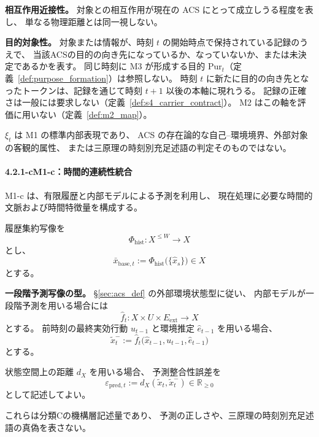 \noindent\textbf{相互作用近接性。}
対象との相互作用が現在の ACS にとって成立しうる程度を表し、
単なる物理距離とは同一視しない。

\noindent\textbf{目的対象性。}
対象または情報が、時刻 $t$ の開始時点で保持されている記録のうえで、
当該ACSの目的の向き先になっているか、なっていないか、または未決定であるかを表す。
同じ時刻に M3 が形成する目的 $\mathrm{Pur}_t$（定義~\ref{def:purpose_formation}）は参照しない。
時刻 $t$ に新たに目的の向き先となったトークンは、記録を通じて時刻 $t+1$ 以後の本軸に現れうる。
記録の正確さは一般には要求しない（定義~\ref{def:s4_carrier_contract}）。
M2 はこの軸を評価に用いない（定義~\ref{def:m2_map}）。

\begin{remark}[識別状態の役割と非真値性]
\label{rem:id_vector_role}
$\xi_t$ は M1 の標準内部表現であり、
ACS の存在論的な自己--環境境界、外部対象の客観的属性、
または三原理の時刻別充足述語の判定そのものではない。
\end{remark}

\paragraph*{4.2.1-c\quad M1-c：時間的連続性統合}

M1-c は、有限履歴と内部モデルによる予測を利用し、
現在処理に必要な時間的文脈および時間特徴量を構成する。

\begin{definition}
\label{def:m1_temporal_base}
履歴集約写像を
\[
  \Phi_{\mathrm{hist}}:
  X^{\le W}\to X
\]
とし、
\[
  \bar x_{\mathrm{base},t}
  :=
  \Phi_{\mathrm{hist}}
  \bigl(\{\hat x_s\}\bigr)
  \in X
\]
とする。
\end{definition}

\noindent\textbf{一段階予測写像の型。}
\S\ref{sec:acs_def} の外部環境状態型に従い、
内部モデルが一段階予測を用いる場合には
\[
  \hat f_t:
  X\times U\times E_{\mathrm{ext}}
  \to X
\]
とする。
前時刻の最終実効行動 $u_{t-1}$ と環境推定 $\hat e_{t-1}$ を用いる場合、
\[
  \tilde x_t^{-}
  :=
  \hat f_t
  \bigl(
    \hat x_{t-1},
    u_{t-1},
    \hat e_{t-1}
  \bigr)
\]
とする。

\begin{definition}
\label{def:m1_temporal_features}
状態空間上の距離 $d_X$ を用いる場合、
予測整合性誤差を
\[
  \varepsilon_{\mathrm{pred},t}
  :=
  d_X(\tilde x_t,\tilde x_t^{-})
  \in\mathbb R_{\ge0}
\]
として記述してよい。

これらは分類Cの機構層記述量であり、
予測の正しさや、三原理の時刻別充足述語の真偽を表さない。
\end{definition}

